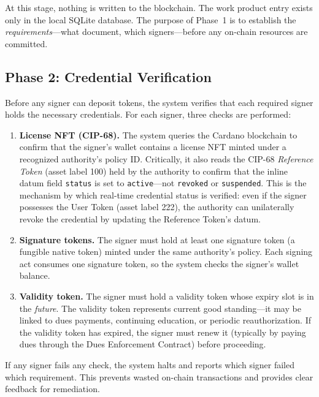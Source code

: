 At this stage, nothing is written to the blockchain.  The work product entry
exists only in the local SQLite database.  The purpose of Phase~1 is to
establish the \emph{requirements}---what document, which signers---before
any on-chain resources are committed.

\subsection{Phase 2: Credential Verification}

Before any signer can deposit tokens, the system verifies that each required
signer holds the necessary credentials.  For each signer, three checks are
performed:

\begin{enumerate}[nosep]
  \item \textbf{License NFT (CIP-68).}  The system queries the Cardano
    blockchain to confirm that the signer's wallet contains a license NFT
    minted under a recognized authority's policy ID.  Critically, it also
    reads the CIP-68 \emph{Reference Token} (asset label 100) held by the
    authority to confirm that the inline datum field \texttt{status} is set
    to \texttt{active}---not \texttt{revoked} or \texttt{suspended}.  This
    is the mechanism by which real-time credential status is verified: even
    if the signer possesses the User Token (asset label 222), the authority
    can unilaterally revoke the credential by updating the Reference Token's
    datum.
  \item \textbf{Signature tokens.}  The signer must hold at least one
    signature token (a fungible native token) minted under the same
    authority's policy.  Each signing act consumes one signature token, so
    the system checks the signer's wallet balance.
  \item \textbf{Validity token.}  The signer must hold a validity token
    whose expiry slot is in the \emph{future}.  The validity token represents
    current good standing---it may be linked to dues payments, continuing
    education, or periodic reauthorization.  If the validity token has
    expired, the signer must renew it (typically by paying dues through the
    Dues Enforcement Contract) before proceeding.
\end{enumerate}

If any signer fails any check, the system halts and reports which signer
failed which requirement.  This prevents wasted on-chain transactions and
provides clear feedback for remediation.

